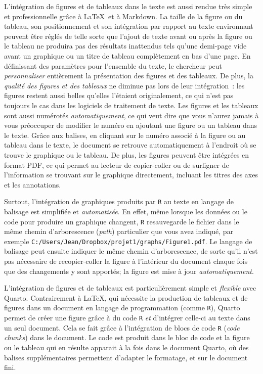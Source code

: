\documentclass[
  letterpaper,
]{scrbook}
\begin{document}
L'intégration de figures et de tableaux dans le texte est aussi rendue
très simple et professionnelle grâce à \LaTeX~et à Markdown. La taille
de la figure ou du tableau, son positionnement et son intégration par
rapport au texte environnant peuvent être réglés de telle sorte que
l'ajout de texte avant ou après la figure ou le tableau ne produira pas
des résultats inattendus tels qu'une demi-page vide avant un graphique
ou un titre de tableau complètement en bas d'une page. En définissant
des paramètres pour l'ensemble du texte, le chercheur peut
\emph{personnaliser} entièrement la présentation des figures et des
tableaux. De plus, la \emph{qualité des figures et des tableaux} ne
diminue pas lors de leur intégration~: les figures restent aussi belles
qu'elles l'étaient originalement, ce qui n'est pas toujours le cas dans
les logiciels de traitement de texte. Les figures et les tableaux sont
aussi numérotés \emph{automatiquement}, ce qui veut dire que vous
n'aurez jamais à vous préoccuper de modifier le numéro en ajoutant une
figure ou un tableau dans le texte. Grâce aux balises, en cliquant sur
le numéro associé à la figure ou au tableau dans le texte, le document
se retrouve automatiquement à l'endroit où se trouve le graphique ou le
tableau. De plus, les figures peuvent être intégrées en format PDF, ce
qui permet au lecteur de copier-coller ou de surligner de l'information
se trouvant sur le graphique directement, incluant les titres des axes
et les annotations.

Surtout, l'intégration de graphiques produits par \texttt{R} au texte en
langage de balisage est simplifiée et \emph{automatisée}. En effet, même
lorsque les données ou le code pour produire un graphique changent,
\texttt{R} resauvegarde le fichier dans le même chemin d'arborescence
(\emph{path}) particulier que vous avez indiqué, par exemple
\texttt{C:/Users/Jean/Dropbox/projet1/graphs/Figure1.pdf}. Le langage de
balisage peut ensuite indiquer le même chemin d'arborescence, de sorte
qu'il n'est pas nécessaire de recopier-coller la figure à l'intérieur du
document chaque fois que des changements y sont apportés; la figure est
mise à jour \emph{automatiquement}.

L'intégration de figures et de tableaux est particulièrement simple et
\emph{flexible} avec Quarto. Contrairement à \LaTeX, qui nécessite la
production de tableaux et de figures dans un document en langage de
programmation (comme \texttt{R}), Quarto permet de créer une figure
grâce à du code \texttt{R} \emph{et} d'intégrer celle-ci au texte dans
un seul document. Cela se fait grâce à l'intégration de blocs de code
\texttt{R} (\emph{code chunks}) dans le document. Le code est produit
dans le bloc de code et la figure ou le tableau qui en résulte apparait
à la fois dans le document Quarto, où des balises supplémentaires
permettent d'adapter le formatage, et sur le document fini.
\end{document}
